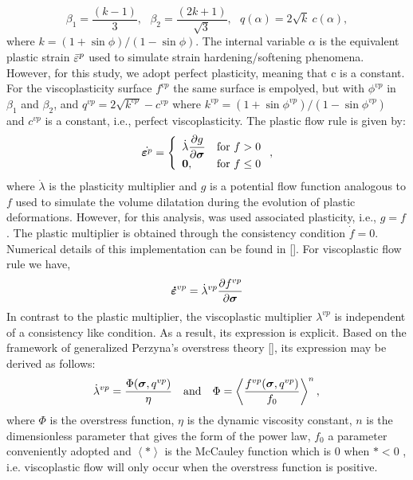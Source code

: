 \documentclass[a4paper,fleqn]{cas-sc}
\begin{document}
\begin{equation}
	\label{eq:f_DP_inscrita_MC}
	\beta_1 = \dfrac{(k-1)}{3}, ~~~ \beta_2 = \dfrac{(2k+1)}{\sqrt{3}}, ~~~
	q(\alpha) = 2\sqrt{k}~c(\alpha),
\end{equation}
where $k = (1+\sin{\phi})/(1-\sin{\phi})$. The internal variable $\alpha$ is the equivalent plastic strain $\bar \varepsilon^p$ used to simulate strain hardening/softening phenomena. However, for this study, we adopt perfect plasticity, meaning that c is a constant. For the viscoplasticity surface $f^{vp}$ the same surface is empolyed, but with $\phi^{vp}$ in $\beta_1$ and $\beta_2$, and $q^{vp} = 2\sqrt{k^{vp}}-c^{vp}$ where $k^{vp} = (1+\sin{\phi^{vp}})/(1-\sin{\phi^{vp}})$ and $c^{vp}$ is a constant, i.e., perfect viscoplasticity. 
The plastic flow rule is given by:
\begin{equation}
	\label{eq_plastic_flow}
	\dot {\boldsymbol{\varepsilon}^{p}} = \left\{ 
	\begin{array}{ll} 
		\dot \lambda \dfrac{\partial g}{\partial \boldsymbol{\sigma}} &  \text{for } f > 0 \\ 
		\boldsymbol 0, & \text{for } f \le 0 \\
	\end{array}\right.,
\end{equation}
where $\dot \lambda$ is the plasticity multiplier and $g$ is a potential flow function analogous to $f$ used to simulate the volume dilatation during the evolution of plastic deformations. However, for this analysis, was used associated plasticity, i.e., $g=f$. The plastic multiplier is obtained through the consistency condition $\dot f = 0$. Numerical details of this implementation can be found in []. For viscoplastic flow rule we have,
\begin{equation}
	\label{eq_viscoplastic_flow}
	\boldsymbol{\dot{\varepsilon}}^{vp} = \dot \lambda^{vp} \dfrac{\partial f^{vp}}{\partial \boldsymbol{\sigma}}
\end{equation}
In contrast to the plastic multiplier, the viscoplastic multiplier $\lambda^{vp}$ is independent of a consistency like condition. As a result, its expression is explicit. Based on the framework of generalized Perzyna's overstress theory [], its expression may be derived as follows:
\begin{equation} \label{eq_perzyna_model}
	\dot \lambda^{vp} = \dfrac{\Phi(\boldsymbol{\sigma},q^{vp})}{\eta}~~~\text{and}~~~\Phi = \left\langle  \dfrac{f^{vp}(\boldsymbol{\sigma},q^{vp})}{f_0} \right\rangle^n, \,
\end{equation} where $\Phi$ is the overstress function, $\eta$ is the dynamic viscosity constant, $n$ is the dimensionless parameter that gives the form of the power law, $f_0$ a parameter conveniently adopted and $\left\langle * \right\rangle$ is the McCauley function which is $0$ when $* <0$ , i.e. viscoplastic flow will only occur when the overstress function is positive.
\end{document}
